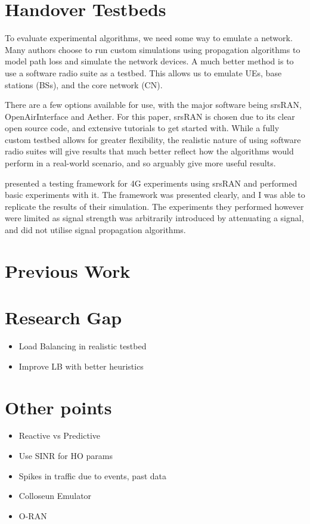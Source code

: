 \section{Handover Testbeds}
To evaluate experimental algorithms, we need some way to emulate a network. Many authors choose to run custom simulations using propagation algorithms to model path loss and simulate the network devices. A much better method is to use a software radio suite as a testbed. This allows us to emulate UEs, base stations (BSs), and the core network (CN).

There are a few options available for use, with the major software being srsRAN, OpenAirInterface and Aether. For this paper, srsRAN is chosen due to its clear open source code, and extensive tutorials to get started with. While a fully custom testbed allows for greater flexibility, the realistic nature of using software radio suites will give results that much better reflect how the algorithms would perform in a real-world scenario, and so arguably give more useful results.

\citet{powell_handover_2021} presented a testing framework for 4G experiments using srsRAN and performed basic experiments with it. The framework was presented clearly, and I was able to replicate the results of their simulation. The experiments they performed however were limited as signal strength was arbitrarily introduced by attenuating a signal, and did not utilise signal propagation algorithms.


\section{Previous Work}
\citet{}

\section{Research Gap}
\begin{itemize}
    \item Load Balancing in realistic testbed
    \item Improve LB with better heuristics
\end{itemize}

\section{Other points}
\begin{itemize}
    \item Reactive vs Predictive
    \item Use SINR for HO params
    \item Spikes in traffic due to events, past data
    \item Colloseun Emulator
    \item O-RAN
\end{itemize}